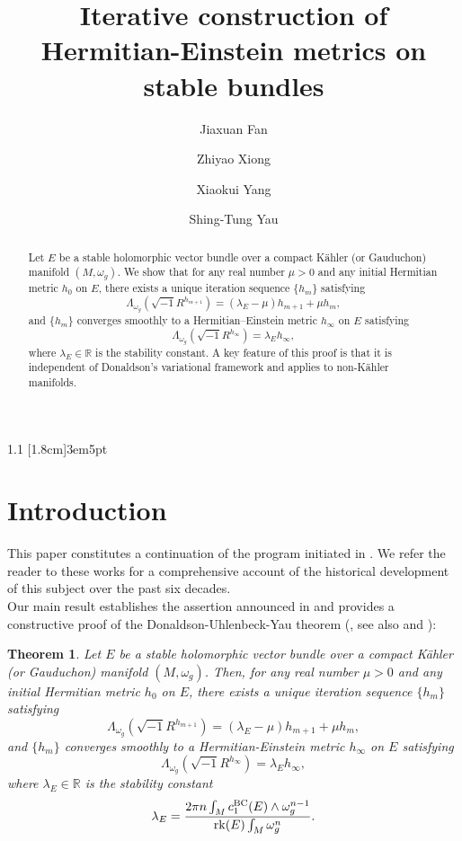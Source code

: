 \documentclass[12pt, reqno]{amsart}
\title{Iterative construction of Hermitian-Einstein metrics on stable bundles}
\author{}
\date{}
\author{Jiaxuan Fan}
\author{Zhiyao Xiong}
\author{Xiaokui Yang}
\author{Shing-Tung Yau}
\newcommand{\rk}{{\rm rk}}
\theoremstyle{plain}
\newtheorem{thm}{Theorem}[section]
\theoremstyle{definition}
\newcommand{\btheorem}{\begin{thm}}
\newcommand{\etheorem}{\end{thm}}
\newcommand{\beq}{\begin{equation}}
\newcommand{\eeq}{\end{equation}}
\renewcommand{\>}{\rightarrow}
\newcommand{\R}{{\mathbb R}}
\newcommand{\om}{\omega}
\numberwithin{equation}{section}
\begin{document}
	
	\begin{abstract}
		Let $E$ be a stable  holomorphic vector bundle over a compact K\"ahler (or  Gauduchon) manifold $(M,\omega_g)$. We show that
		for any real number $\mu>0$ and any initial Hermitian metric $h_0$ on $E$, there exists a unique iteration sequence $\{h_m\}$ satisfying
		$$
		\Lambda_{\omega_g}\left(\sqrt{-1}R^{h_{m+1}}\right)
		=(\lambda_E-\mu)h_{m+1}+\mu h_m,
		$$
		 and  $\{h_m\}$ converges smoothly to a Hermitian--Einstein metric $h_\infty$ on $E$ satisfying
		$$
		\Lambda_{\omega_g}\left(\sqrt{-1}R^{h_{\infty}}\right)
		=\lambda_Eh_\infty,
		$$
		where $\lambda_E\in \R$ is the stability constant. A key feature of this proof is that it is independent of Donaldson's variational 
		framework and applies to non-K\"ahler manifolds.
	\end{abstract}
	\maketitle
	
	{\small{    \begin{spacing}{1.1} \tableofcontents %
			[1.8cm]{}{3em}{5pt} %
\end{spacing} }} 
\vspace*{-1\baselineskip} 
	
	\section{Introduction}
	This paper constitutes a continuation of the program initiated in \cite{WYY26+, FWYY26+, WYY26b+,XYY26+, XYY26b+}.  We refer the reader to these works for a comprehensive account of the historical development of this subject over the past six decades.\\
	
	
	Our main result establishes the assertion announced in \cite[Remark~1.8, Item~$4$]{WYY26+} and provides a constructive proof of the Donaldson-Uhlenbeck-Yau theorem (\cite{Don85,UY86,Don87}, see also \cite{NS65} and \cite{LY86}):
	
	\btheorem\label{main theorem}
	Let $E$ be a stable holomorphic vector  bundle over a compact K\"ahler (or Gauduchon) manifold $(M,\omega_g)$.  Then, for any real number $\mu>0$ and any initial Hermitian metric $h_0$ on $E$,  there exists a unique iteration sequence $\{h_m\}$ satisfying
	\beq 
	\Lambda_{\omega_g}\left(\sqrt{-1}R^{h_{m+1}}\right)
	=(\lambda_E-\mu)h_{m+1}+\mu h_m,
	\eeq 
	 and  $\{h_m\}$ converges smoothly to a Hermitian-Einstein metric $h_\infty$ on $E$ satisfying
	\beq 
	\Lambda_{\omega_g}\left(\sqrt{-1}R^{h_{\infty}}\right)
	=\lambda_Eh_\infty,
	\eeq 
	where $\lambda_E\in \R$ is the stability constant
	\begin{equation}
	\lambda_E=\frac{2\pi n\int_M c^{\mathrm{BC}}_1(E)\wedge\omega_g^{n-1}}{\rk(E)\int_M\om_g^n}.
	\label{lambda definition}
	\end{equation}
	\etheorem
	
\end{document}
